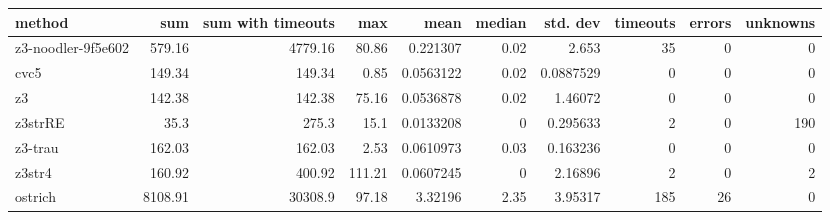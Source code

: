 \begin{tabular}{lrrrrrrrrr}
\hline
 method             &     sum &   sum with timeouts &    max &      mean &   median &   std. dev &   timeouts &   errors &   unknowns \\
\hline
 z3-noodler-9f5e602 &  579.16 &             4779.16 &  80.86 & 0.221307  &     0.02 &  2.653     &         35 &        0 &          0 \\
 cvc5               &  149.34 &              149.34 &   0.85 & 0.0563122 &     0.02 &  0.0887529 &          0 &        0 &          0 \\
 z3                 &  142.38 &              142.38 &  75.16 & 0.0536878 &     0.02 &  1.46072   &          0 &        0 &          0 \\
 z3strRE            &   35.3  &              275.3  &  15.1  & 0.0133208 &     0    &  0.295633  &          2 &        0 &        190 \\
 z3-trau            &  162.03 &              162.03 &   2.53 & 0.0610973 &     0.03 &  0.163236  &          0 &        0 &          0 \\
 z3str4             &  160.92 &              400.92 & 111.21 & 0.0607245 &     0    &  2.16896   &          2 &        0 &          2 \\
 ostrich            & 8108.91 &            30308.9  &  97.18 & 3.32196   &     2.35 &  3.95317   &        185 &       26 &          0 \\
\hline
\end{tabular}
